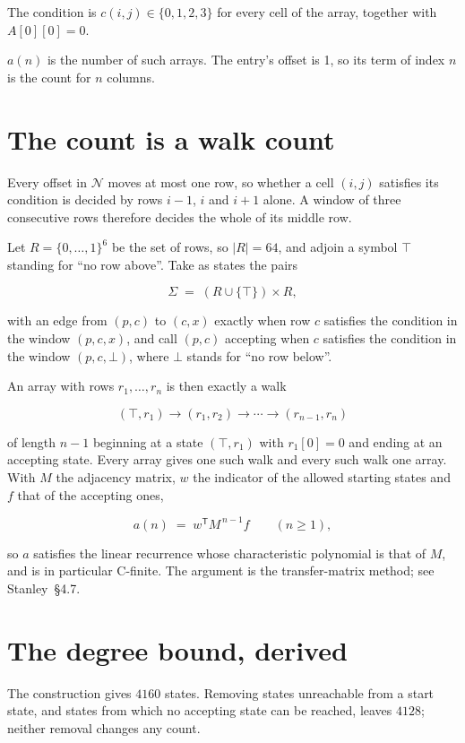 \documentclass[11pt]{article}
\theoremstyle{definition}
\begin{document}
The condition is $c(i,j) \in \{0, 1, 2, 3\}$ for every cell of the array, together with $A[0][0]=0$.

$a(n)$ is the number of such arrays. The entry's offset is 1, so its term of index $n$ is the count for $n$ columns.

\section{The count is a walk count}

Every offset in $\mathcal{N}$ moves at most one row, so whether a cell $(i,j)$ satisfies its condition is decided by rows $i-1$, $i$ and $i+1$ alone. A window of three consecutive rows therefore decides the whole of its middle row.

Let $R = \{0,\dots,1\}^{6}$ be the set of rows, so $|R| = 64$, and adjoin a symbol $\top$ standing for ``no row above''. Take as states the pairs

\[\Sigma \;=\; (R \cup \{\top\}) \times R,\]

with an edge from $(p,c)$ to $(c,x)$ exactly when row $c$ satisfies the condition in the window $(p,c,x)$, and call $(p,c)$ accepting when $c$ satisfies the condition in the window $(p,c,\bot)$, where $\bot$ stands for ``no row below''.

An array with rows $r_1,\dots,r_n$ is then exactly a walk

\[(\top,r_1) \to (r_1,r_2) \to \cdots \to (r_{n-1},r_n)\]

of length $n-1$ beginning at a state $(\top,r_1)$ with $r_1[0]=0$ and ending at an accepting state. Every array gives one such walk and every such walk one array. With $M$ the adjacency matrix, $w$ the indicator of the allowed starting states and $f$ that of the accepting ones,

\[a(n) \;=\; w^{\mathsf T} M^{\,n-1} f \qquad (n \ge 1),\]

so $a$ satisfies the linear recurrence whose characteristic polynomial is that of $M$, and is in particular C-finite. The argument is the transfer-matrix method; see Stanley~\S4.7.

\section{The degree bound, derived}

The construction gives $4160$ states. Removing states unreachable from a start state, and states from which no accepting state can be reached, leaves $4128$; neither removal changes any count.
\end{document}
